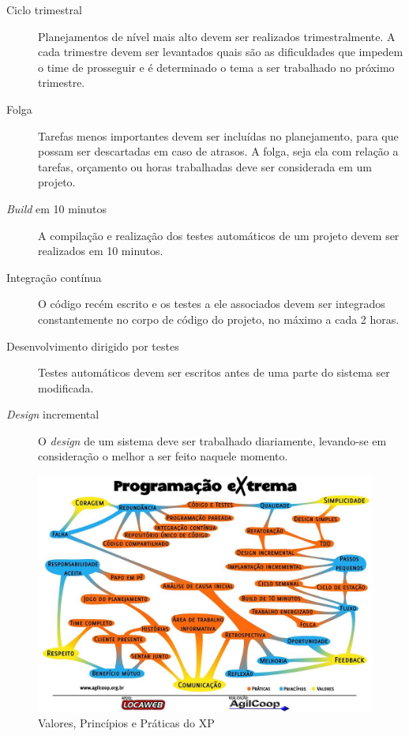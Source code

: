 \begin{description}
      \item[Ciclo trimestral]
      Planejamentos de nível mais alto devem ser realizados trimestralmente. A cada trimestre devem ser levantados quais são as dificuldades que impedem o time de prosseguir e é determinado o tema a ser trabalhado no próximo trimestre.
      \item[Folga]
      Tarefas menos importantes devem ser incluídas no planejamento, para que possam ser descartadas em caso de atrasos. A folga, seja ela com relação a tarefas, orçamento ou horas trabalhadas deve ser considerada em um projeto.
      \item[\textit{Build} em 10 minutos]
      A compilação e realização dos testes automáticos de um projeto devem ser realizados em 10 minutos.
      \item[Integração contínua]
      O código recém escrito e os testes a ele associados devem ser integrados constantemente no corpo de código do projeto, no máximo a cada 2 horas.
      \item[Desenvolvimento dirigido por testes]
      Testes automáticos devem ser escritos antes de uma parte do sistema ser modificada.
      \item[\textit{Design} incremental]
      O \textit{design} de um sistema deve ser trabalhado diariamente, levando-se em consideração o melhor a ser feito naquele momento.
    \end{description}

    \begin{figure}[h]
        \begin{center}
    \includegraphics[width=1.0\linewidth]{arquivos/xp.jpg}
        \end{center}
        \caption{Valores, Princípios e Práticas do XP}
        \label{perfil}
    \end{figure}

